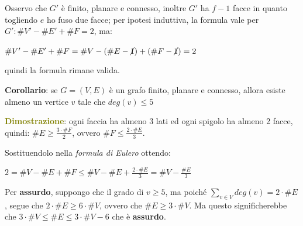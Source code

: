 \begin{flushleft}
\begin{boxA}
        Osservo che $G'$ è finito, planare e connesso, inoltre $G'$ ha $f-1$ facce in quanto togliendo $e$ ho fuso due facce; per ipotesi induttiva, la formula vale per $G': \# V' - \# E' + \# F = 2$, ma:

        {\centering
            $\# V' - \# E' + \# F = \# V - (\# E - \cancel{1}) + (\# F - \cancel{1}) = 2$
        \par}
        quindi la formula rimane valida.
    \end{boxA}

    \textbf{Corollario}: se $G = (V, E)$ è un grafo finito, planare e connesso, allora esiste almeno un vertice $v$ tale che $deg(v) \leq 5$
    \begin{boxA}
        \textcolor{olive}{\textbf{Dimostrazione}}: ogni faccia ha almeno 3 lati ed ogni spigolo ha almeno 2 facce, quindi: $\# E \geq \frac{3 \cdot \# F}{2}$, ovvero $\# F \leq \frac{2 \cdot \# E}{3}$.

        Sostituendolo nella \textit{formula di Eulero} ottendo:

        {\centering
            $2 = \# V - \# E + \# F \leq \# V - \# E + \frac{2 \cdot \# E}{3} = \# V - \frac{\# E}{3}$
        \par}
        Per \textbf{assurdo}, suppongo che il grado di $v \geq 5$, ma poiché $\underset{v \in V}{\sum} deg(v) = 2 \cdot \# E$, segue che $2 \cdot \# E \geq 6 \cdot \# V$, ovvero che $\# E \geq 3 \cdot \# V$. Ma questo significherebbe che $3 \cdot \# V \leq \# E \leq 3 \cdot \# V - 6$ che è \textbf{assurdo}.
    \end{boxA}
\end{flushleft}

